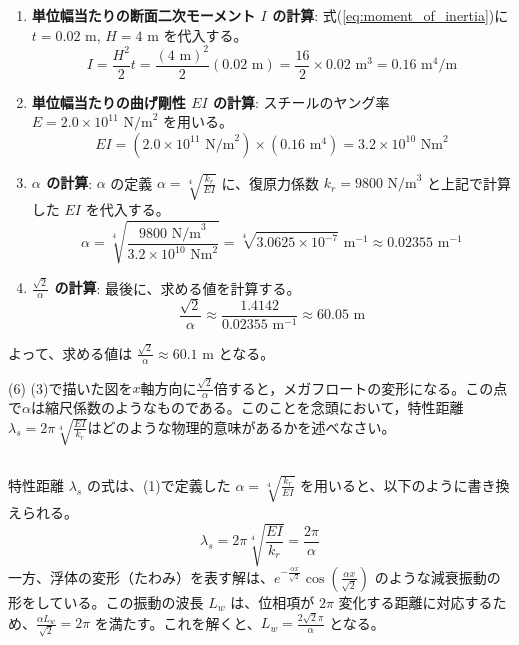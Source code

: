\documentclass[dvipdfmx,a4paper]{jsarticle}
\begin{document}
    \begin{enumerate}
        \item \textbf{単位幅当たりの断面二次モーメント $I$ の計算}:
        式(\ref{eq:moment_of_inertia})に $t=0.02 \text{ m}$, $H=4 \text{ m}$ を代入する。
        $$ I = \frac{H^2}{2}t = \frac{(4 \text{ m})^2}{2} (0.02 \text{ m}) = \frac{16}{2} \times 0.02 \text{ m}^3 = 0.16 \text{ m}^4/\text{m} $$
        
        \item \textbf{単位幅当たりの曲げ剛性 $EI$ の計算}:
        スチールのヤング率 $E = 2.0 \times 10^{11} \text{ N/m}^2$ を用いる。
        $$ EI = (2.0 \times 10^{11} \text{ N/m}^2) \times (0.16 \text{ m}^4) = 3.2 \times 10^{10} \text{ Nm}^2 $$
        
        \item \textbf{$\alpha$ の計算}:
        $\alpha$ の定義 $\alpha = \sqrt[4]{\frac{k_r}{EI}}$ に、復原力係数 $k_r = 9800 \text{ N/m}^3$ と上記で計算した $EI$ を代入する。
        $$ \alpha = \sqrt[4]{\frac{9800 \text{ N/m}^3}{3.2 \times 10^{10} \text{ Nm}^2}} = \sqrt[4]{3.0625 \times 10^{-7}} \text{ m}^{-1} \approx 0.02355 \text{ m}^{-1} $$
        
        \item \textbf{$\frac{\sqrt{2}}{\alpha}$ の計算}:
        最後に、求める値を計算する。
        $$ \frac{\sqrt{2}}{\alpha} \approx \frac{1.4142}{0.02355 \text{ m}^{-1}} \approx 60.05 \text{ m} $$
    \end{enumerate}
    
    よって、求める値は $\frac{\sqrt{2}}{\alpha} \approx 60.1 \text{ m}$ となる。
    
    \vspace{1cm}
    
    (6) (3)で描いた図を$x$軸方向に$\frac{\sqrt{2}}{\alpha}$倍すると，メガフロートの変形になる。この点で$\alpha$は縮尺係数のようなものである。このことを念頭において，特性距離$\lambda_s=2\pi\sqrt[4]{\frac{EI}{k_r}}$はどのような物理的意味があるかを述べなさい。
    
    \subsection*{}
    特性距離 $\lambda_s$ の式は、(1)で定義した $\alpha = \sqrt[4]{\frac{k_r}{EI}}$ を用いると、以下のように書き換えられる。
    $$ \lambda_s = 2\pi\sqrt[4]{\frac{EI}{k_r}} = \frac{2\pi}{\alpha} $$
    一方、浮体の変形（たわみ）を表す解は、$e^{-\frac{\alpha x}{\sqrt{2}}}\cos(\frac{\alpha x}{\sqrt{2}})$ のような減衰振動の形をしている。この振動の波長 $L_w$ は、位相項が $2\pi$ 変化する距離に対応するため、$\frac{\alpha L_w}{\sqrt{2}} = 2\pi$ を満たす。これを解くと、$L_w = \frac{2\sqrt{2}\pi}{\alpha}$ となる。
    
\end{document}
